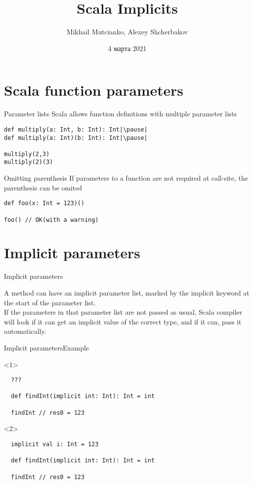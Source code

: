 \documentclass[aspectratio=169]{beamer}
\title{Scala Implicits}
\author{Mikhail Mutcianko, Alexey Shcherbakov}
\institute{СПБгУ, СП}
\date{4 марта 2021}
\begin{document}
\frame{\titlepage}

\section{Scala function parameters}

\begin{frame}[fragile]{Parameter lists}
  Scala allows function definitions with multiple parameter lists \\
\begin{verbatim}
def multiply(a: Int, b: Int): Int|\pause|
def multiply(a: Int)(b: Int): Int|\pause|

multiply(2,3)
multiply(2)(3)
\end{verbatim}
\end{frame}

\begin{frame}[fragile]{Omitting parenthesis}
If parameters to a function are not required at call-site, the parenthesis can be omited \\
\begin{verbatim}
def foo(x: Int = 123)()

foo() // OK(with a warning)
\end{verbatim}
\end{frame}

\section{Implicit parameters}

\begin{frame}{Implicit parameters}
  \begin{block}{}
    A method can have an implicit parameter list, marked by the \alert{implicit} keyword at the
    start of the parameter list.\vspace{1em}\\If the parameters in that parameter list are not
    passed as usual, Scala compiler will look if it can get an implicit value of the correct type,
    and if it can, pass it automatically. 
  \end{block}
\end{frame}

\begin{frame}[fragile]{Implicit parameters}{Example}
\begin{onlyenv}<1>
  \begin{verbatim}
  ???

  def findInt(implicit int: Int): Int = int

  findInt // res0 = 123
  \end{verbatim} 
\end{onlyenv}
\begin{onlyenv}<2>
  \begin{verbatim}
  implicit val i: Int = 123

  def findInt(implicit int: Int): Int = int

  findInt // res0 = 123
  \end{verbatim}
\end{onlyenv}
\end{frame}
\end{document}
